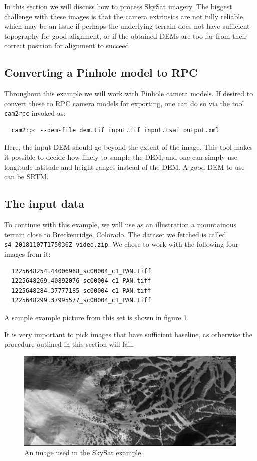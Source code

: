 In this section we will discuss how to process SkySat imagery. The
biggest challenge with these images is that the camera extrinsics are
not fully reliable, which may be an issue if perhaps the underlying
terrain does not have sufficient topography for good alignment, or if
the obtained DEMs are too far from their correct position for alignment
to succeed.

\subsection{Converting a Pinhole model to RPC}
Throughout this example we will work with Pinhole camera models. If desired to convert these
to RPC camera models for exporting, one can do so via the tool \texttt{cam2rpc} invoked as:

\begin{verbatim}
  cam2rpc --dem-file dem.tif input.tif input.tsai output.xml 
\end{verbatim}
Here, the input DEM should go beyond the extent of the image.
This tool makes it possible to decide how finely to sample the DEM, and one can simply use
longitude-latitude and height ranges instead of the DEM. A good DEM to use can be SRTM.

\subsection{The input data}

To continue with this example, we will use as an illustration a
mountainous terrain close to Breckenridge, Colorado. The dataset we
fetched is called \texttt{s4\_20181107T175036Z\_video.zip}. We chose to
work with the following four images from it:

\begin{verbatim}
  1225648254.44006968_sc00004_c1_PAN.tiff
  1225648269.40892076_sc00004_c1_PAN.tiff
  1225648284.37777185_sc00004_c1_PAN.tiff
  1225648299.37995577_sc00004_c1_PAN.tiff
\end{verbatim}

A sample example picture from this set is shown in figure \ref{skysat-example}.

It is very important to pick images that have sufficient baseline, as otherwise 
the procedure outlined in this section will fail. 

\begin{figure}[h!]
\centering
\includegraphics[width=5.0in]{images/Breckenridge.jpg}
\caption{An image used in the SkySat example.}
\label{skysat-example}
\end{figure}

